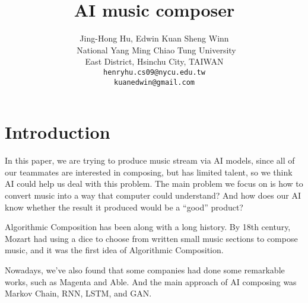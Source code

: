 \documentclass[10pt,twocolumn,letterpaper]{article}
\begin{document}
\title{AI music composer}

\author{Jing-Hong Hu, Edwin Kuan Sheng Winn\\\
National Yang Ming Chiao Tung University\\
East District, Hsinchu City, TAIWAN\\
{\tt\small henryhu.cs09@nycu.edu.tw}\\
{\tt\small kuanedwin@gmail.com}
}
\maketitle

\begin{abstract}
\end{abstract}




\section{Introduction}
In this paper, we are trying to produce music stream via AI models, since all of our teammates are interested in composing, but has limited talent, so we think AI could help us deal with this problem. The main problem we focus on is how to convert music into a way that computer could understand? And how does our AI know whether the result it produced would be a “good” product?

Algorithmic Composition has been along with a long history. By 18th century, Mozart had using a dice to choose from written small music sections to compose music, and it was the first idea of Algorithmic Composition.

Nowadays, we’ve also found that some companies had done some remarkable works, such as Magenta and Able. And the main approach of AI composing was Markov Chain, RNN, LSTM, and GAN.
\end{document}

